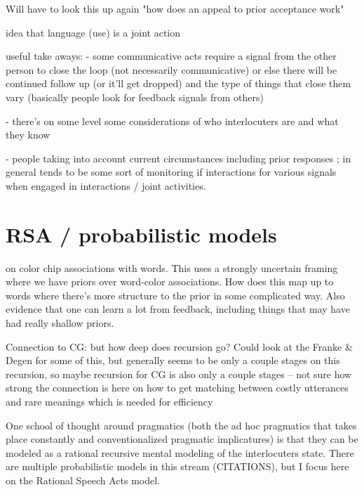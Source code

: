 \documentclass[]{article}
\begin{document}
\cite{clark1986} Will have to look this up again "how does an appeal to prior acceptance work"



\cite{clark1996} idea that language (use) is a joint action

\cite{clark1996} useful take aways: - some communicative acts require a signal from the other person to close the loop (not necessarily communicative) or else there will be continued follow up (or it’ll get dropped) and the type of things that close them vary (basically people look for feedback signals from others)

- there’s on some level some considerations of who interlocuters are and what they know

- people taking into account current circumstances including prior responses ; in general tends to be some sort of monitoring if interactions for various signals when engaged in interactions / joint activities.







\section{RSA / probabilistic models }


\cite{murthy2022} on color chip associations with words. This uses a strongly uncertain framing where we have priors over word-color associations. How does this map up to words where there's more structure to the prior in some complicated way. Also evidence that one can learn a lot from feedback, including things that may have had really shallow priors. 

Connection to CG: but how deep does recursion go? Could look at the Franke \& Degen for some of this, but generally seems to be only a couple stages on this recursion, so maybe recursion for CG is also only a couple stages -- not sure how strong the connection is here
\cite{bergen} on how to get matching between costly utterances and rare meanings which is needed for efficiency

One school of thought around pragmatics (both the ad hoc pragmatics that takes place constantly and conventionalized pragmatic implicatures) is that they can be modeled as a rational recursive mental modeling of the interlocuters state. There are multiple probabilistic models in this stream (CITATIONS), but I focus here on the Rational Speech Acts model. 
\end{document}
